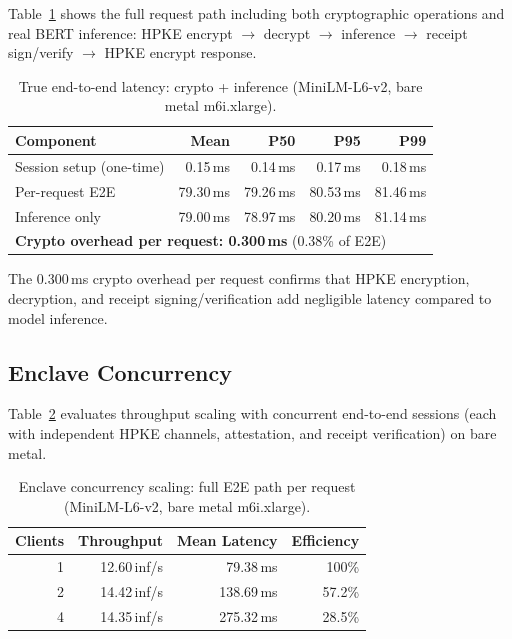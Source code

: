 \documentclass[11pt,a4paper]{article}
\newcommand{\BenchInstance}{m6i.xlarge}
\newcommand{\BenchModelName}{MiniLM-L6-v2}
\begin{document}
Table~\ref{tab:true-e2e} shows the full request path including both cryptographic operations and real BERT inference: HPKE encrypt $\rightarrow$ decrypt $\rightarrow$ inference $\rightarrow$ receipt sign/verify $\rightarrow$ HPKE encrypt response.

\begin{table}[ht]
\centering
\caption{True end-to-end latency: crypto + inference (\BenchModelName{}, bare metal \BenchInstance{}).}
\label{tab:true-e2e}
\begin{tabular}{lrrrr}
\hline
\textbf{Component} & \textbf{Mean} & \textbf{P50} & \textbf{P95} & \textbf{P99} \\
\hline
Session setup (one-time) & 0.15\,ms & 0.14\,ms & 0.17\,ms & 0.18\,ms \\
Per-request E2E          & 79.30\,ms & 79.26\,ms & 80.53\,ms & 81.46\,ms \\
Inference only           & 79.00\,ms & 78.97\,ms & 80.20\,ms & 81.14\,ms \\
\hline
\multicolumn{5}{l}{\textbf{Crypto overhead per request: 0.300\,ms} (0.38\% of E2E)} \\
\hline
\end{tabular}
\end{table}

The 0.300\,ms crypto overhead per request confirms that HPKE encryption, decryption, and receipt signing/verification add negligible latency compared to model inference.

\subsection{Enclave Concurrency}

Table~\ref{tab:enclave-concurrency} evaluates throughput scaling with concurrent end-to-end sessions (each with independent HPKE channels, attestation, and receipt verification) on bare metal.

\begin{table}[ht]
\centering
\caption{Enclave concurrency scaling: full E2E path per request (\BenchModelName{}, bare metal \BenchInstance{}).}
\label{tab:enclave-concurrency}
\begin{tabular}{rrrr}
\hline
\textbf{Clients} & \textbf{Throughput} & \textbf{Mean Latency} & \textbf{Efficiency} \\
\hline
1 & 12.60\,inf/s & 79.38\,ms  & 100\% \\
2 & 14.42\,inf/s & 138.69\,ms & 57.2\% \\
4 & 14.35\,inf/s & 275.32\,ms & 28.5\% \\
\hline
\end{tabular}
\end{table}
\end{document}
